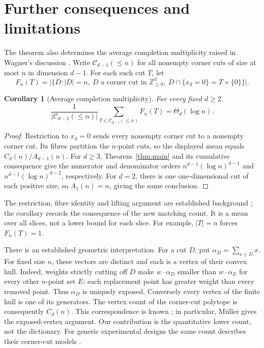 \documentclass[11pt,a4paper]{article}
\newtheorem{corollary}[theorem]{Corollary}
\theoremstyle{remark}
\newcommand{\Z}{\mathbb Z}
\newcommand{\Nzero}{\Z_{\geq0}}
\newcommand{\card}[1]{\lvert#1\rvert}
\begin{document}
\section{Further consequences and limitations}\label{sec:consequences}
The theorem also determines the average completion multiplicity raised
in Wagner's discussion \cite[Section 3.5]{W03}. Write
\(\mathcal C_{d-1}(\leq n)\) for all nonempty corner cuts of size at
most \(n\) in dimension \(d-1\). For each such cut \(T\), let
\[
 F_n(T)=\card{\{D:\card D=n,\ D\text{ a corner cut in }
 \Nzero^d,\ D\cap\{x_d=0\}=T\times\{0\}\}}.
\]
\begin{corollary}[Average completion multiplicity]\label{cor:fibres}
For every fixed \(d\geq2\),
\[
 \frac{1}{\card{\mathcal C_{d-1}(\leq n)}}
 \sum_{T\in\mathcal C_{d-1}(\leq n)}F_n(T)
 =\Theta_d(\log n).
\]
\end{corollary}
\begin{proof}
Restriction to \(x_d=0\) sends every nonempty corner cut to a nonempty
corner cut. Its fibres partition the \(n\)-point cuts, so the displayed
mean equals \(C_d(n)/A_{d-1}(n)\).
For \(d\geq3\), Theorem~\ref{thm:main} and its cumulative consequence
give the numerator and denominator orders
\(n^{d-1}(\log n)^{d-1}\) and
\(n^{d-1}(\log n)^{d-2}\), respectively.
For \(d=2\), there is one one-dimensional cut of each positive size,
so \(A_1(n)=n\), giving the same conclusion.
\end{proof}
The restriction, fibre identity and lifting argument are established
background \cite[Lemma 3.5 and Section 3.5]{W03}; the corollary records
the consequence of the new matching count. It is a mean over all slices,
not a lower bound for each slice. For example, \(\card T=n\) forces
\(F_n(T)=1\).

There is an established geometric interpretation.
For a cut \(D\), put \(\alpha_D=\sum_{x\in D}x\).
For fixed size \(n\), these vectors are distinct and each is a vertex
of their convex hull. Indeed, weights strictly cutting off \(D\)
make \(w\cdot\alpha_D\) smaller than \(w\cdot\alpha_E\) for every
other \(n\)-point set \(E\): each replacement point has greater
weight than every removed point. Thus \(\alpha_D\) is uniquely exposed.
Conversely every vertex of the finite hull is one of its generators.
The vertex count of the corner-cut polytope is consequently \(C_d(n)\).
This correspondence is known \cite{OS,Muller,BMORW}; in particular,
M\"uller \cite[Lemma 2.6]{Muller} gives the exposed-vertex argument.
Our contribution is the
quantitative lower count, not the dictionary.
For generic experimental designs the same count describes their
corner-cut models \cite[Definition 7 and Theorem 2]{BMORW}.
\end{document}
